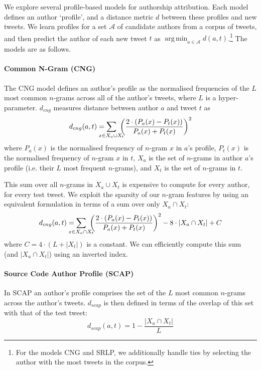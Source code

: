 \documentclass[twocolumn,10pt]{article}
\DeclareMathOperator*{\argmin}{arg\,min}
\begin{document}
We explore several profile-based models for authorship attribution.
Each model defines an author  `profile', and a distance metric $d$
between these profiles and new tweets.
We learn profiles for a set $\mathcal{A}$ of candidate authors from
a corpus of tweets, and then predict the author of each new tweet
$t$ as $\argmin_{a \in \mathcal{A}} d(a, t)$.\footnote{
For the models CNG and SRLP, we additionally handle ties
by selecting the author with the most tweets in the corpus.}
The models are as follows.

\paragraph{Common N-Gram (CNG)}
The CNG model\supercite{kevselj2003n} defines an author's profile as the normalised frequencies of the $L$ most common $n$-grams across all of the author's tweets, where $L$ is a hyper-parameter.
$d_{cng}$ measures distance between author $a$ and tweet $t$ as
$$
d_{cng}(a, t) =
    \smashoperator{\sum_{x \in X_a \cup X_t}}\ 
        {\left ( \frac{2 \cdot (P_a(x) - P_t(x))}{P_a(x) + P_t(x)} \right )}^2
$$
where $P_a(x)$ is the normalised frequency of $n$-gram $x$ in $a$'s profile, $P_t(x)$ is the normalised frequency of $n$-gram $x$ in $t$, $X_a$ is the set of $n$-grams in author $a$'s profile (i.e. their $L$ most frequent $n$-grams), and $X_t$ is the set of $n$-grams in $t$.

This sum over all $n$-grams in $X_a \cup X_t$ is expensive
to compute for every author, for every test tweet.
We exploit the sparsity of our $n$-gram features by using
an equivalent formulation in terms of a sum over only
$X_a \cap X_t$:
$$
d_{cng} (a, t) =
    \smashoperator{\sum_{x \in X_a \cap X_t}}\ 
        {\left ( \frac{2 \cdot (P_a(x) - P_t(x))}{P_a(x) + P_t(x)} \right )}^2
        - 8 \cdot |X_a \cap X_t| + C
$$
where $C=4 \cdot (L + |X_t|)$ is a constant.
We can efficiently compute this sum (and $|X_a \cap X_t|$) using an inverted index.

\paragraph{Source Code Author Profile (SCAP)} In SCAP\supercite{frantzeskou2006effective}
an author's profile comprises the set of the $L$ most common
$n$-grams across the author's tweets. $d_{scap}$ is then defined in
terms of the overlap of this set with that of the test tweet:
$$
d_{scap}(a, t) = 1 - \frac{|X_a \cap X_t|}{L} %
$$
\end{document}
